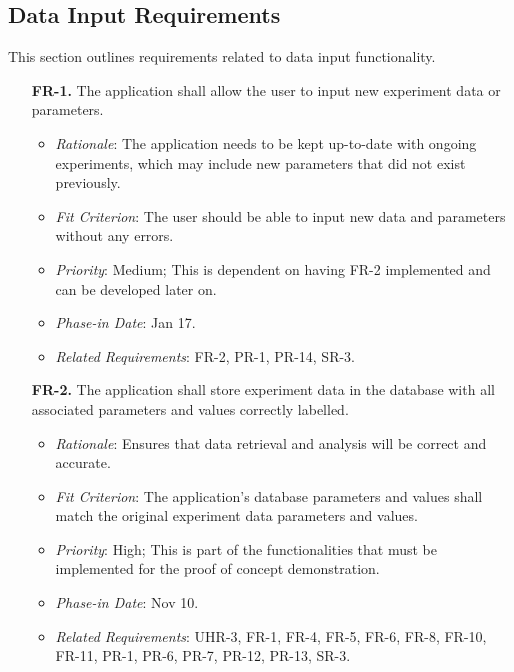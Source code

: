 \documentclass[12pt]{article}
\begin{document}
\subsection{Data Input Requirements}
This section outlines requirements related to data input functionality.
  \begin{enumerate}
    \item[\textbf{FR-1.}] The application shall allow the user to input new experiment data or parameters.
    \begin{itemize}
    \item \textit{Rationale}: The application needs to be kept up-to-date with ongoing experiments, which may include new parameters that did not exist previously.
    \item \textit{Fit Criterion}: The user should be able to input new data and parameters without any errors.
    \item \textit{Priority}: Medium; This is dependent on having FR-2 implemented and can be developed later on.
    \item \textit{Phase-in Date}: Jan 17.
    \item \textit{Related Requirements}: FR-2, PR-1, PR-14, SR-3.
    \end{itemize}
    \item[\textbf{FR-2.}] The application shall store experiment data in the database with all associated parameters and values correctly labelled.
    \begin{itemize}
      \item \textit{Rationale}: Ensures that data retrieval and analysis will be correct and accurate.
      \item \textit{Fit Criterion}: The application's database parameters and values shall match the original experiment data parameters and values.
      \item \textit{Priority}: High; This is part of the functionalities that must be implemented for the proof of concept demonstration.
      \item \textit{Phase-in Date}: Nov 10.
      \item \textit{Related Requirements}: UHR-3, FR-1, FR-4, FR-5, FR-6, FR-8, FR-10, FR-11, PR-1, PR-6, PR-7, PR-12, PR-13, SR-3.
    \end{itemize}
  \end{enumerate}
\end{document}
